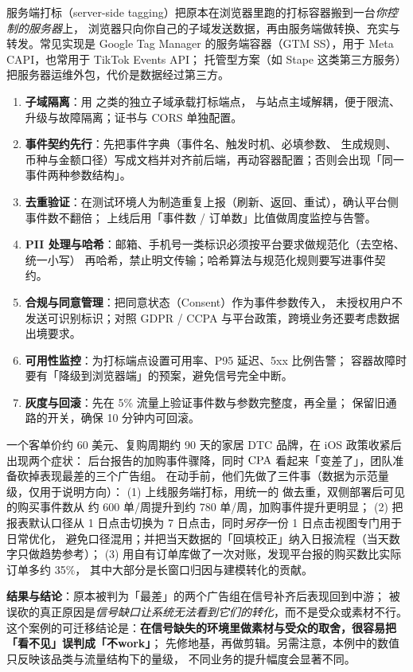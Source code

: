 服务端打标（server-side tagging）把原本在浏览器里跑的打标容器搬到一台\emph{你控制的服务器}上，
浏览器只向你自己的子域发送数据，再由服务端做转换、充实与转发。常见实现是
Google Tag Manager 的服务端容器（GTM SS），用于 Meta CAPI，也常用于 TikTok Events API；
托管型方案（如 Stape 这类第三方服务）把服务器运维外包，代价是数据经过第三方。

\begin{toolbox}
\begin{enumerate}
  \item \textbf{子域隔离}：用  之类的独立子域承载打标端点，
        与站点主域解耦，便于限流、升级与故障隔离；证书与 CORS 单独配置。
  \item \textbf{事件契约先行}：先把事件字典（事件名、触发时机、必填参数、 生成规则、
        币种与金额口径）写成文档并对齐前后端，再动容器配置；否则会出现「同一事件两种参数结构」。
  \item \textbf{去重验证}：在测试环境人为制造重复上报（刷新、返回、重试），确认平台侧事件数不翻倍；
        上线后用「事件数 / 订单数」比值做周度监控与告警。
  \item \textbf{PII 处理与哈希}：邮箱、手机号一类标识必须按平台要求做规范化（去空格、统一小写）
        再哈希，禁止明文传输；哈希算法与规范化规则要写进事件契约。
  \item \textbf{合规与同意管理}：把同意状态（Consent）作为事件参数传入，
        未授权用户不发送可识别标识；对照 GDPR / CCPA 与平台政策，跨境业务还要考虑数据出境要求。
  \item \textbf{可用性监控}：为打标端点设置可用率、P95 延迟、5xx 比例告警；
        容器故障时要有「降级到浏览器端」的预案，避免信号完全中断。
  \item \textbf{灰度与回滚}：先在 5\% 流量上验证事件数与参数完整度，再全量；
        保留旧通路的开关，确保 10 分钟内可回滚。
\end{enumerate}
\end{toolbox}

\begin{casebox}
一个客单价约 60 美元、复购周期约 90 天的家居 DTC 品牌，在 iOS 政策收紧后出现两个症状：
后台报告的加购事件骤降，同时 $\operatorname{CPA}$ 看起来「变差了」，团队准备砍掉表现最差的三个广告组。
在动手前，他们先做了三件事（数据为示范量级，仅用于说明方向）：
(1) 上线服务端打标，用统一的  做去重，双侧部署后可见的购买事件数从
        约 600 单/周提升到约 780 单/周，加购事件提升更明显；
(2) 把报表默认口径从 1 日点击切换为 7 日点击，同时\emph{另存}一份 1 日点击视图专门用于日常优化，
        避免口径混用；并把当天数据的「回填校正」纳入日报流程（当天数字只做趋势参考）；
(3) 用自有订单库做了一次对账，发现平台报的购买数比实际订单多约 35\%，
        其中大部分是长窗口归因与建模转化的贡献。

\textbf{结果与结论}：原本被判为「最差」的两个广告组在信号补齐后表现回到中游；
被误砍的真正原因是\emph{信号缺口让系统无法看到它们的转化}，而不是受众或素材不行。
这个案例的可迁移结论是：\textbf{在信号缺失的环境里做素材与受众的取舍，很容易把「看不见」误判成「不work」}；
先修地基，再做剪辑。另需注意，本例中的数值只反映该品类与流量结构下的量级，
不同业务的提升幅度会显著不同。
\end{casebox}

